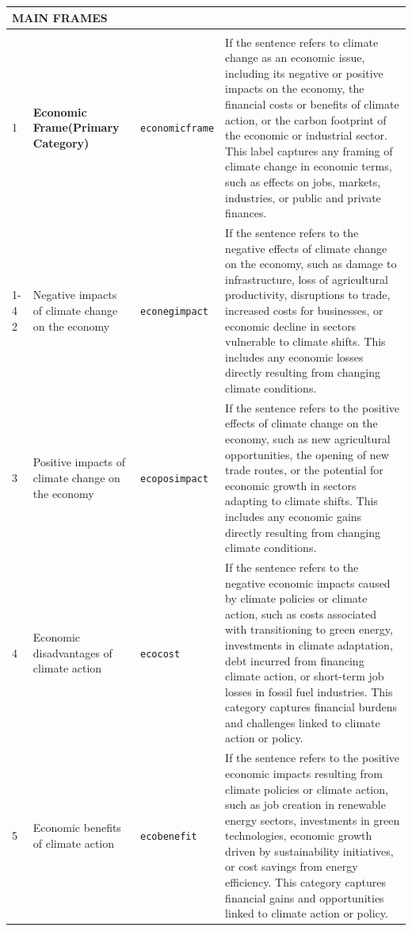 \documentclass[12pt]{article}
\renewcommand\_{\texttt{\detokenize{_}\allowbreak}}
\begin{document}
{\begin{longtable}{p{0.5cm}p{4.5cm}p{2.8cm}p{13.5cm}}
\multicolumn{4}{l}{\cellcolor{gray!10}\textbf{MAIN FRAMES}} \\
\midrule
\rowcolor{gray!8}
\multicolumn{4}{l}{\textit{Economic Frame}} \\
\midrule
1 & \textbf{Economic Frame\newline (Primary Category)} & \texttt{economic\_frame} & If the sentence refers to climate change as an economic issue, including its negative or positive impacts on the economy, the financial costs or benefits of climate action, or the carbon footprint of the economic or industrial sector. This label captures any framing of climate change in economic terms, such as effects on jobs, markets, industries, or public and private finances. \\
\cmidrule(lr){1-4}
2 & Negative impacts of climate change on the economy & \texttt{eco\_neg\_impact} & If the sentence refers to the negative effects of climate change on the economy, such as damage to infrastructure, loss of agricultural productivity, disruptions to trade, increased costs for businesses, or economic decline in sectors vulnerable to climate shifts. This includes any economic losses directly resulting from changing climate conditions. \\
3 & Positive impacts of climate change on the economy & \texttt{eco\_pos\_impact} & If the sentence refers to the positive effects of climate change on the economy, such as new agricultural opportunities, the opening of new trade routes, or the potential for economic growth in sectors adapting to climate shifts. This includes any economic gains directly resulting from changing climate conditions. \\
4 & Economic disadvantages of climate action & \texttt{eco\_cost} & If the sentence refers to the negative economic impacts caused by climate policies or climate action, such as costs associated with transitioning to green energy, investments in climate adaptation, debt incurred from financing climate action, or short-term job losses in fossil fuel industries. This category captures financial burdens and challenges linked to climate action or policy. \\
5 & Economic benefits of climate action & \texttt{eco\_benefit} & If the sentence refers to the positive economic impacts resulting from climate policies or climate action, such as job creation in renewable energy sectors, investments in green technologies, economic growth driven by sustainability initiatives, or cost savings from energy efficiency. This category captures financial gains and opportunities linked to climate action or policy. \\

\end{longtable}}
\end{document}

